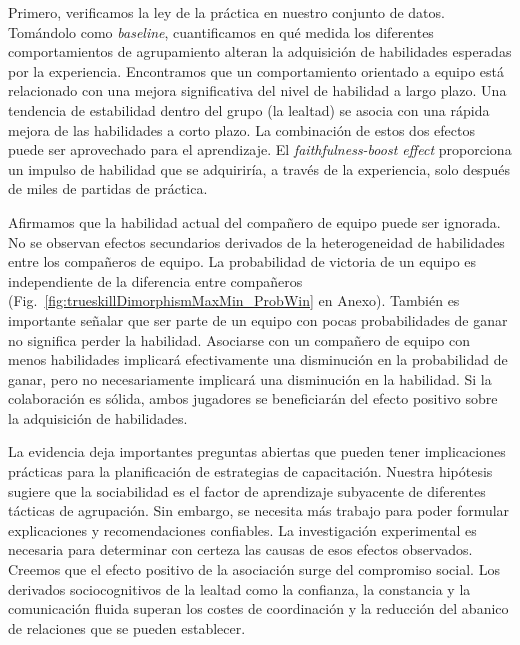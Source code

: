 \documentclass[a4paper,11pt]{book}
\theoremstyle{definition}
\begin{document}
Primero, verificamos la ley de la pr\'actica en nuestro conjunto de datos.
%
%
Tom\'andolo como \emph{baseline}, cuantificamos en qu\'e medida los diferentes comportamientos de agrupamiento alteran la adquisici\'on de habilidades esperadas por la experiencia.
%
Encontramos que un comportamiento orientado a equipo est\'a relacionado con una mejora significativa del nivel de habilidad a largo plazo.
%
Una tendencia de estabilidad dentro del grupo (la lealtad) se asocia con una r\'apida mejora de las habilidades a corto plazo.
%
La combinaci\'on de estos dos efectos puede ser aprovechado para el aprendizaje.
%
El \emph{faithfulness-boost effect} proporciona un impulso de habilidad que se adquirir\'ia, a trav\'es de la experiencia, solo despu\'es de miles de partidas de pr\'actica.


Afirmamos que la habilidad actual del compa\~nero de equipo puede ser ignorada.
%
No se observan efectos secundarios derivados de la heterogeneidad de habilidades entre los compa\~neros de equipo.
%
La probabilidad de victoria de un equipo es independiente de la diferencia entre compa\~neros (Fig.~\ref{fig:trueskillDimorphismMaxMin_ProbWin} en Anexo).
%
Tambi\'en es importante se\~nalar que ser parte de un equipo con pocas probabilidades de ganar no significa perder la habilidad.
%
Asociarse con un compa\~nero de equipo con menos habilidades implicar\'a efectivamente una disminuci\'on en la probabilidad de ganar, pero no necesariamente implicar\'a una disminuci\'on en la habilidad.
%
Si la colaboraci\'on es s\'olida, ambos jugadores se beneficiar\'an del efecto positivo sobre la adquisici\'on de habilidades.


La evidencia deja importantes preguntas abiertas que pueden tener implicaciones pr\'acticas para la planificaci\'on de estrategias de capacitaci\'on.
%
Nuestra hip\'otesis sugiere que la sociabilidad es el factor de aprendizaje subyacente de diferentes t\'acticas de agrupaci\'on.
%
Sin embargo, se necesita m\'as trabajo para poder formular explicaciones y recomendaciones confiables.
%
La investigaci\'on experimental es necesaria para determinar con certeza las causas de esos efectos observados.
%
Creemos que el efecto positivo de la asociaci\'on surge del compromiso social.
%
Los derivados sociocognitivos de la lealtad como la confianza, la constancia y la comunicaci\'on fluida superan los costes de coordinaci\'on y la reducci\'on del abanico de relaciones que se pueden establecer.
\end{document}
